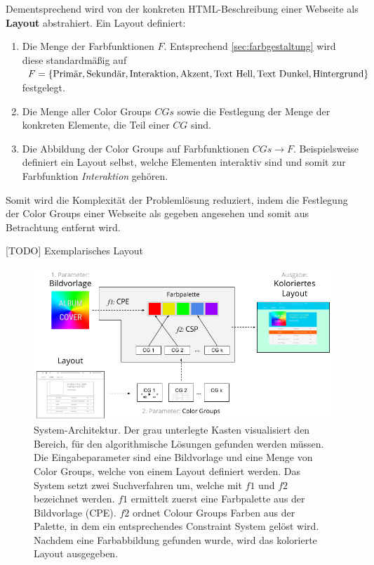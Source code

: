 \documentclass[11pt, bibliography=totoc]{scrartcl}
\begin{document}
Dementsprechend wird von der konkreten HTML-Beschreibung einer Webseite als  \textbf{Layout} abstrahiert. Ein Layout definiert:
\begin{enumerate}
	\item Die Menge der Farbfunktionen $F$. Entsprechend \autoref{sec:farbgestaltung} wird diese standardmäßig auf $F = \{\text{Primär}, \text{Sekundär}, \text{Interaktion},\\ \text{Akzent}, \text{Text Hell}, \text{Text Dunkel}, \text{Hintergrund}\}$ festgelegt.
	\item Die Menge aller Color Groups $CGs$ sowie die Festlegung der Menge der konkreten Elemente, die Teil einer $CG$ sind.
 	\item Die Abbildung der Color Groups auf Farbfunktionen $CGs \to F$. Beispielsweise definiert ein Layout selbst, welche Elementen interaktiv sind und somit zur Farbfunktion \emph{Interaktion} gehören.
\end{enumerate}

Somit wird die Komplexität der Problemlösung reduziert, indem die Festlegung der Color Groups einer Webseite als gegeben angesehen und somit aus Betrachtung entfernt wird.

[TODO] Exemplarisches Layout

\begin{figure}
	\centering
	\includegraphics[width=1\textwidth]{img/architecture.png}
	\caption{System-Architektur. Der grau unterlegte Kasten visualisiert den Bereich, für den algorithmische Lösungen gefunden werden müssen. Die Eingabeparameter sind eine Bildvorlage und eine Menge von Color Groups, welche von einem Layout definiert werden. Das System setzt zwei Suchverfahren um, welche mit $f1$ und $f2$ bezeichnet werden. $f1$ ermittelt zuerst eine Farbpalette aus der Bildvorlage (CPE). $f2$ ordnet Colour Groups Farben aus der Palette, in dem ein entsprechendes Constraint System gelöst wird. Nachdem eine Farbabbildung gefunden wurde, wird das kolorierte Layout ausgegeben. }
	\label{fig:architecture}
\end{figure}
\end{document}
